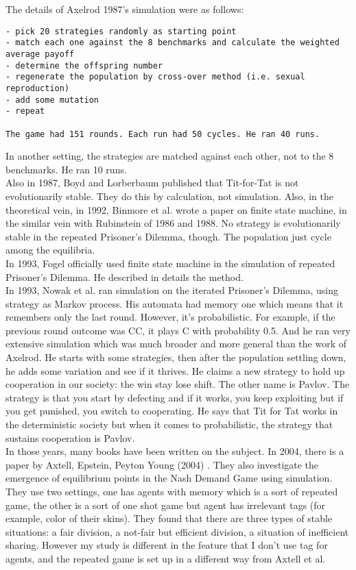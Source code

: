 \documentclass[12.5pt]{report}
\begin{document}
The details of Axelrod 1987's simulation were as follows: 
\begin{verbatim}
- pick 20 strategies randomly as starting point
- match each one against the 8 benchmarks and calculate the weighted average payoff
- determine the offspring number
- regenerate the population by cross-over method (i.e. sexual reproduction)
- add some mutation
- repeat

The game had 151 rounds. Each run had 50 cycles. He ran 40 runs.
\end{verbatim}
In another setting, the strategies are matched against each other, not to the 8 benchmarks. He ran 10 runs.\\

Also in 1987, Boyd and Lorberbaum \cite{boyd,lorb} published that Tit-for-Tat is not evolutionarily stable. They do this by calculation, not simulation. Also, in the theoretical vein, in 1992, Binmore et al. wrote a paper on finite state machine, in the similar vein with Rubinstein of 1986 and 1988. No strategy is evolutionarily stable in the repeated Prisoner's Dilemma, though. The population just cycle among the equilibria.\\

In 1993, Fogel officially used finite state machine in the simulation of repeated Prisoner's Dilemma. He described in details the method.\\

In 1993, Nowak et al. ran simulation on the iterated Prisoner's Dilemma, using strategy as Markov process. His automata had memory one which means that it remembers only the last round. However, it's probabilistic. For example, if the previous round outcome was CC, it plays C with probability 0.5. And he ran very extensive simulation which was much broader and more general than the work of Axelrod. He starts with some strategies, then after the population settling down, he adds some variation and see if it thrives. He claims a new strategy to hold up cooperation in our society: the win stay lose shift. The other name is Pavlov. The strategy is that you start by defecting and if it works, you keep exploiting but if you get punished, you switch to cooperating. He says that Tit for Tat works in the deterministic society but when it comes to probabilistic, the strategy that sustains cooperation is Pavlov.\\

In those years, many books have been written on the subject. In 2004, there is a paper by Axtell, Epstein, Peyton Young (2004) \cite{axtell}. They also investigate the emergence of equilibrium points in the Nash Demand Game using simulation. They use two settings, one has agents with memory which is a sort of repeated game, the other is a sort of one shot game but agent has irrelevant tags (for example, color of their skins). They found that there are three types of stable situations: a fair division, a not-fair but efficient division, a situation of inefficient sharing. However my study is different in the feature that I don't use tag for agents, and the repeated game is set up in a different way from Axtell et al.\\
\end{document}
